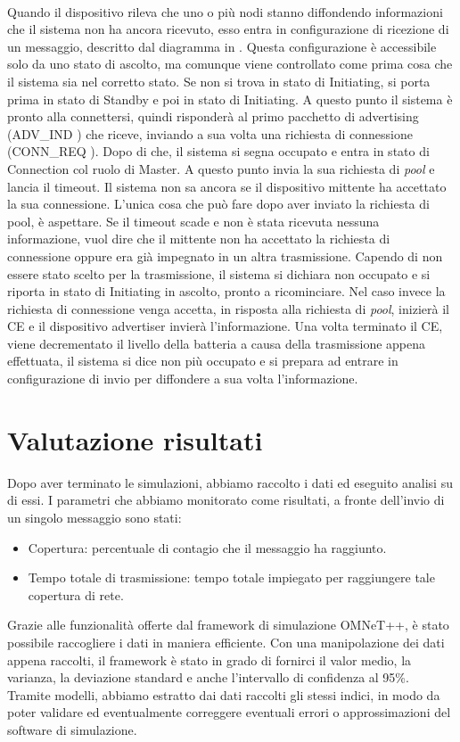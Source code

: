 \\
Quando il dispositivo rileva che uno o più nodi stanno diffondendo informazioni che il sistema non ha ancora ricevuto, esso entra in configurazione di ricezione di un messaggio, descritto dal diagramma in . Questa configurazione è accessibile solo da uno stato di ascolto, ma comunque viene controllato come prima cosa che il sistema sia nel corretto stato. Se non si trova in stato di Initiating, si porta prima in stato di Standby e poi in stato di Initiating. A questo punto il sistema è pronto alla connettersi, quindi risponderà al primo pacchetto di advertising (ADV\_IND \cite{BT-CoreSpec4.0}) che riceve, inviando a sua volta una richiesta di connessione (CONN\_REQ \cite{BT-CoreSpec4.0}). Dopo di che, il sistema si segna occupato e entra in stato di Connection col ruolo di Master. A questo punto invia la sua richiesta di \textit{pool} e lancia il timeout. Il sistema non sa ancora se il dispositivo mittente ha accettato la sua connessione. L'unica cosa che può fare dopo aver inviato la richiesta di pool, è aspettare. Se il timeout scade e non è stata ricevuta nessuna informazione, vuol dire che il mittente non ha accettato la richiesta di connessione oppure era già impegnato in un altra trasmissione. Capendo di non essere stato scelto per la trasmissione, il sistema si dichiara non occupato e si riporta in stato di Initiating in ascolto, pronto a ricominciare. Nel caso invece la richiesta di connessione venga accetta, in risposta alla richiesta di \textit{pool}, inizierà il \acs{CE} e il dispositivo advertiser invierà l'informazione. Una volta terminato il \acs{CE}, viene decrementato il livello della batteria a causa della trasmissione appena effettuata, il sistema si dice non più occupato e si prepara ad entrare in configurazione di invio per diffondere a sua volta l'informazione.
\bigskip

\section{Valutazione risultati}
Dopo aver terminato le simulazioni, abbiamo raccolto i dati ed eseguito analisi su di essi. I parametri che abbiamo monitorato come risultati, a fronte dell'invio di un singolo messaggio sono stati:
\begin{itemize}
	\item Copertura: percentuale di contagio che il messaggio ha raggiunto.
	\item Tempo totale di trasmissione: tempo totale impiegato per raggiungere tale copertura di rete.
\end{itemize}
Grazie alle funzionalità offerte dal framework di simulazione OMNeT++, è stato possibile raccogliere i dati in maniera efficiente. Con una manipolazione dei dati appena raccolti, il framework è stato in grado di fornirci il valor medio, la varianza, la deviazione standard e anche l'intervallo di confidenza al 95\%. Tramite modelli, abbiamo estratto dai dati raccolti gli stessi indici, in modo da poter validare ed eventualmente correggere eventuali errori o approssimazioni del software di simulazione.

